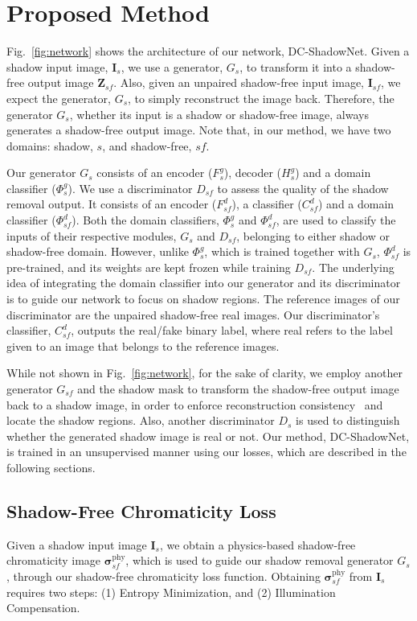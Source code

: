 \documentclass[10pt,twocolumn,letterpaper]{article}
\begin{document}
\section{Proposed Method}
\label{sec:method}
Fig.~\ref{fig:network} shows the architecture of our network, DC-ShadowNet.  
Given a shadow input image, $\mathbf{I}_s$, we use a generator, $G_s$, to transform it into a shadow-free output image $\mathbf{Z}_{sf}$. 
Also, given an unpaired shadow-free input image, $\mathbf{I}_{sf}$, we expect the generator, $G_{s}$, to simply  reconstruct the image back.
Therefore, the generator $G_s$, whether its input is a shadow or shadow-free image,  always generates a shadow-free output image. 
Note that, in our method, we have two domains: shadow, $s$, and shadow-free, $sf$. 

Our generator $G_s$ consists of an encoder ($F^g_s$), decoder ($H^g_s$) and a domain classifier ($\Phi^g_s$). 
We use a discriminator $D_{sf}$ to assess the quality of the shadow removal output. It consists of an encoder ($F^d_{sf}$), a classifier ($C^d_{sf}$) and a domain classifier ($\Phi^d_{sf}$).
Both the domain classifiers, $\Phi^g_s$ and $\Phi^d_{sf}$, are used to classify the inputs of their respective modules, $G_s$ and $D_{sf}$, belonging to either shadow or shadow-free domain. However, unlike $\Phi^g_s$, which is trained together with $G_s$, $\Phi^d_{sf}$ is pre-trained, and its weights are kept frozen while training $D_{sf}$. 
The underlying idea of integrating the domain classifier into our generator and its discriminator is to guide our network to focus on shadow regions.
The reference images of our discriminator are the unpaired shadow-free real images. Our discriminator's classifier, $C^d_{sf}$, outputs the real/fake binary label, where real refers to the label given to an image that belongs to the reference images. 

While not shown in Fig.~\ref{fig:network}, for the sake of clarity, we employ another generator $G_{sf}$ and the shadow mask to transform the shadow-free output image back to a shadow image, in order to enforce reconstruction consistency~\cite{Zhu17} and locate the shadow regions.
Also, another discriminator $D_{s}$ is used to distinguish whether the generated shadow image is real or not.
Our method, DC-ShadowNet, is trained in an unsupervised manner using our losses, which are described in the following sections.


\subsection{Shadow-Free Chromaticity Loss}
Given a shadow input image $\mathbf{I}_s$, we obtain a physics-based shadow-free chromaticity image $\pmb{\sigma}_{sf}^\text{phy}$, which is used to guide our shadow removal generator $G_s$, through our shadow-free chromaticity loss function. 
Obtaining $\pmb{\sigma}_{sf}^\text{phy}$ from $\mathbf{I}_s$ requires two steps: (1) Entropy Minimization, and (2) Illumination Compensation. 
\end{document}
